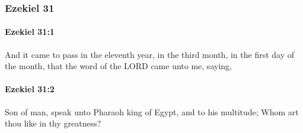	\subsubsection{Ezekiel 31} %
		\label{EZEKIEL-31}

		\paragraph{Ezekiel 31:1} %
			\label{EZEKIEL-31-1}

			And it came to pass in the eleventh year, in the third month, in the first day of the month, that the word of the LORD came unto me, saying,


		\paragraph{Ezekiel 31:2} %
			\label{EZEKIEL-31-2}

			Son of man, speak unto Pharaoh king of Egypt, and to his multitude; Whom art thou like in thy greatness?


